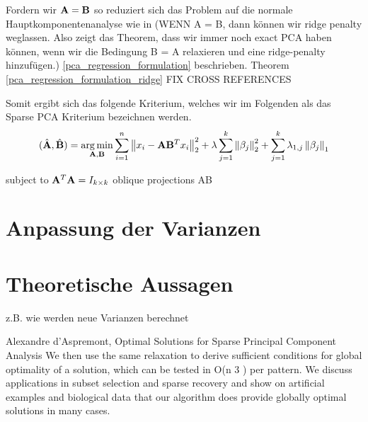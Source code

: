 Fordern wir $\mathbf{A} =  \mathbf{B}$ so reduziert sich das Problem auf die normale Hauptkomponentenanalyse wie in (WENN A = B, dann können wir ridge penalty weglassen. Also zeigt das Theorem, dass wir immer noch exact PCA haben können, wenn wir die Bedingung B = A relaxieren und eine ridge-penalty hinzufügen.) \ref{pca_regression_formulation} beschrieben.
Theorem \ref{pca_regression_formulation_ridge} FIX CROSS REFERENCES

Somit ergibt sich das folgende Kriterium, welches wir im Folgenden als das Sparse PCA Kriterium bezeichnen werden.
$$(\hat{\mathbf{A}}, \hat{\mathbf{B}}) = \operatorname*{arg\,min}_{\mathbf{A}, \mathbf{B}} \sum_{i=1}^{n} \left\lVert x_i - \mathbf{A}\mathbf{B}^Tx_i \right\rVert_2^2 + \lambda \sum_{j=1}^{k}\left\lVert \beta_j \right\rVert_2^2 + \sum_{j=1}^k \lambda_{1,j} \left\lVert \beta_j \right\rVert_1$$

subject to $\mathbf{A}^T\mathbf{A} = I_{k \times k}$
oblique projections AB

\section{Anpassung der Varianzen}

\section{Theoretische Aussagen} \label{theoretical results}
z.B. wie werden neue Varianzen berechnet

Alexandre d’Aspremont, Optimal Solutions for Sparse Principal Component Analysis
We then use the same relaxation to derive sufficient conditions for global optimality of a
solution, which can be tested in O(n
3
) per pattern. We discuss applications in subset selection and
sparse recovery and show on artificial examples and biological data that our algorithm does provide
globally optimal solutions in many cases.